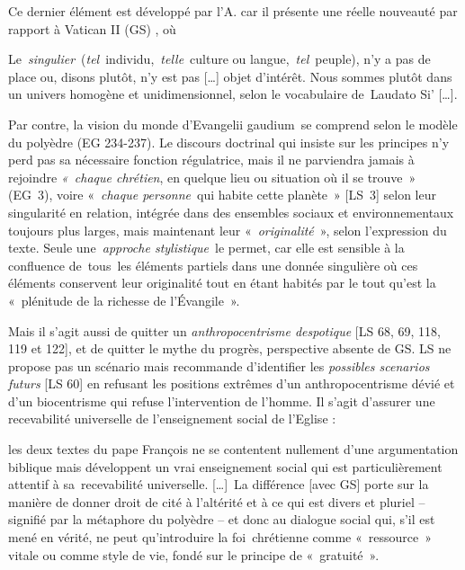 Ce dernier élément est développé par l'A. car il présente une réelle nouveauté par rapport à  Vatican II (GS) , où
 \begin{singlequote}
     Le \textit{singulier} (\textit{tel} individu, \textit{telle} culture ou langue, \textit{tel} peuple), n’y a pas de place ou, disons plutôt, n’y est pas [\ldots] objet d’intérêt. Nous sommes plutôt dans un univers homogène et unidimensionnel, selon le vocabulaire de Laudato Si’ [\ldots]. 
     
     Par contre, la vision du monde d’Evangelii gaudium se comprend selon le modèle du polyèdre (EG 234-237). Le discours doctrinal qui insiste sur les principes n’y perd pas sa nécessaire fonction régulatrice, mais il ne parviendra jamais à rejoindre \textit{« chaque chrétien}, en quelque lieu ou situation où il se trouve » (EG 3), voire « \textit{chaque personne} qui habite cette planète » [LS 3] selon leur singularité en relation, intégrée dans des ensembles sociaux et environnementaux toujours plus larges, mais maintenant leur « \textit{originalité} », selon l’expression du texte. Seule une\textit{ approche stylistique} le permet, car elle est sensible à la confluence de tous les éléments partiels dans une donnée singulière où ces éléments conservent leur originalité tout en étant habités par le tout qu’est la « plénitude de la richesse de l’Évangile ».\cite[par. 29-30]{theobald_lenseignement_2016}
\end{singlequote}
Mais il s'agit aussi de quitter un \textit{anthropocentrisme despotique} [LS 68, 69, 118, 119 et 122], et de quitter le mythe du progrès, perspective absente de GS. LS ne propose pas un scénario mais recommande d'identifier les \textit{possibles scenarios futurs} [LS 60] en refusant les positions extrêmes d'un anthropocentrisme dévié et d'un biocentrisme qui refuse l'intervention de l'homme. Il s'agit d'assurer une recevabilité universelle de l'enseignement social de l'Eglise : 
\begin{singlequote}
    les deux textes du pape François ne se contentent nullement d’une argumentation biblique mais développent un vrai enseignement social qui est particulièrement attentif à sa recevabilité universelle. [\ldots] La différence [avec GS] porte sur la manière de donner droit de cité à l’altérité et à ce qui est divers et pluriel – signifié par la métaphore du polyèdre – et donc au dialogue social qui, s’il est mené en vérité, ne peut qu’introduire la foi chrétienne comme « ressource » vitale ou comme style de vie, fondé sur le principe de « gratuité ». \cite[par. 37]{theobald_lenseignement_2016}
\end{singlequote}
